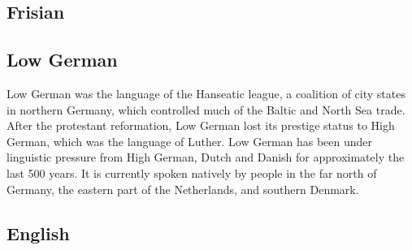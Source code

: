 \subsection{Frisian}\label{sec:Frisian}

\subsection{Low German}\label{sec:LGerman}
Low German was the language of the Hanseatic league, a coalition of city states in northern Germany, which controlled much of the Baltic and North Sea trade. After the protestant reformation, Low German lost its prestige status to High German, which was the language of Luther. Low German has been under linguistic pressure from High German, Dutch and Danish for approximately the last 500 years. It is currently spoken natively by people in the far north of Germany, the eastern part of the Netherlands, and southern Denmark.

\subsection{English}
